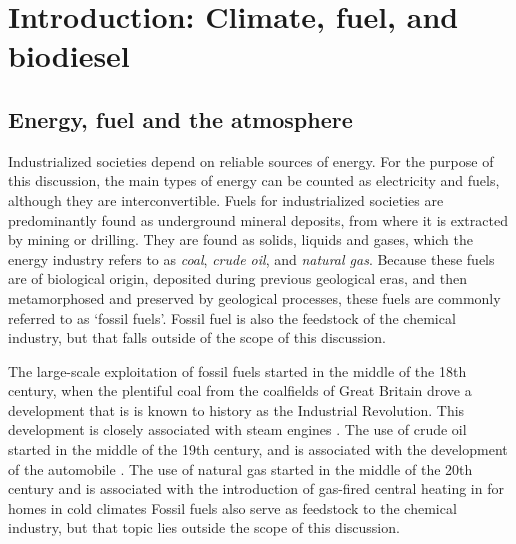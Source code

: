 
\chapter{Introduction: Climate, fuel, and biodiesel} %

\label{Chapter1} %


\section{Energy, fuel and the atmosphere}

Industrialized societies depend on reliable sources of energy. For the purpose
of this discussion, the main types of energy can be counted as electricity and
fuels, although they are interconvertible. Fuels for industrialized societies
are predominantly found as underground mineral deposits, from where it is
extracted by mining or drilling. They are found as solids, liquids and gases,
which the energy industry refers to as \textit{coal}, \textit{crude oil}, and
\textit{natural gas}. Because these fuels are of biological origin, deposited
during previous geological eras, and then metamorphosed and preserved by
geological processes, these fuels are commonly referred to as `fossil fuels'.
Fossil fuel is also the feedstock of the chemical industry, but that falls
outside of the scope of this discussion.

The large-scale exploitation of fossil fuels started in the middle of the 18th
century, when the plentiful coal from the coalfields of Great Britain drove a
development that is is known to history as the Industrial Revolution. This
development is closely associated with steam engines \autocite{Rosen2012}. The
use of crude oil started in the middle of the 19th century, and is associated
with the development of the automobile \autocite[p. 42]{Watts2005}. The use of
natural gas started in the middle of the 20th century and is associated with the
introduction of gas-fired central heating in for homes in cold climates
\autocite{Hanmer2017} Fossil fuels also serve as feedstock to the chemical
industry, but that topic lies outside the scope of this discussion.

